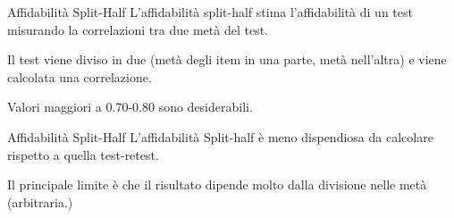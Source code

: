 \documentclass[
  ignorenonframetext,
]{beamer}
\begin{document}
\begin{frame}{Affidabilità Split-Half}
\label{affidabilituxe0-split-half}
L'affidabilità split-half stima l'affidabilità di un test misurando la
correlazioni tra due metà del test.

Il test viene diviso in due (metà degli item in una parte, metà
nell'altra) e viene calcolata una correlazione.

Valori maggiori a 0.70-0.80 sono desiderabili.
\end{frame}

\begin{frame}{Affidabilità Split-Half}
\label{affidabilituxe0-split-half-1}
L'affidabilità Split-half è meno dispendiosa da calcolare rispetto a
quella test-retest.

Il principale limite è che il risultato dipende molto dalla divisione
nelle metà (arbitraria.)
\end{frame}
\end{document}
